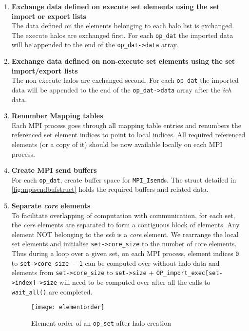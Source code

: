 \documentclass[11pt]{article}
\begin{document}
\begin{enumerate}
\item \textbf{Exchange data defined on execute set elements using the set import
or export lists}\\
The data defined on the elements belonging to each halo list is exchanged. The
execute halos are exchanged first. For each \texttt{op\_dat} the imported data
will be appended to the end of the \texttt{op\_dat->data} array.

\item \textbf{Exchange data defined on non-execute set elements using the set
import/export lists}\\
The non-execute halos are exchanged second. For each \texttt{op\_dat} the
imported data will be appended to the end of the \texttt{op\_dat->data} array
after the \textit{ieh} data.

\item \textbf{Renumber Mapping tables}\\
Each MPI process goes through all mapping table entries and renumbers the
referenced set element indices to point to local indices. All required
referenced elements (or a copy of it) should be now available locally on each MPI process.

\item \textbf{Create MPI send buffers}\\
For each \texttt{op\_dat}, create buffer space for \texttt{MPI\_Isend}s.
The struct detailed in \figurename{ \ref{fig:mpisendbufstruct}} holds the
required buffers and related data.

\item \textbf{Separate \textit{core} elements}\\
To facilitate overlapping of computation with communication, for each set, the
\textit{core} elements are separated to form a contiguous block of elements. Any
element NOT belonging to the \textit{eeh} is a \textit{core} element. We
rearrange the local set elements and initialise \texttt{set->core\_size} to the
number of core elements. Thus during a loop over a given set, on each MPI
process, element indices \texttt{0} to \texttt{set->core\_size - 1} can be
computed over without halo data and elements from \texttt{set->core\_size}
to \texttt{set->size} + \texttt{OP\_import\_exec[set->index]->size} will need to
be computed over after all the calls to \texttt{wait\_all()} are completed.

\begin{figure}[t]\centering\vspace{-0pt}\hspace{10pt}
\texttt{[image: elementorder]}\vspace{-5pt}
\caption{Element order of an \texttt{op\_set} after halo creation}
\label{fig/elementorganization}\vspace{-0pt}
\end{figure}


\end{enumerate}
\end{document}
